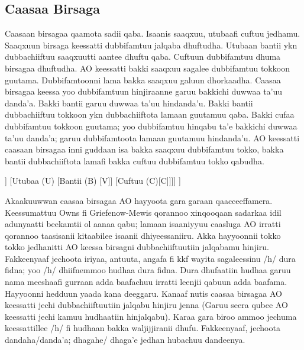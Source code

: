 \documentclass[11pt,b5paper]{book}
\begin{document}
\begin{itemize}
\subsection{Caasaa Birsaga}
\setlength{\parindent}{3em}

Caasaan birsagaa qaamota sadii qaba. Isaanis saaqxuu,  utubaafi cuftuu jedhamu. Saaqxuun birsaga keessatti  dubbifamtuu jalqaba dhuftudha. Utubaan bantii ykn  dubbachiiftuu saaqxuutti aantee dhuftu qaba. Cuftuun  dubbifamtuu dhuma birsagaa dhuftudha. AO keessatti bakki  saaqxuu sagalee dubbifamtuu tokkoon guutama.  Dubbifamtoonni lama bakka saaqxuu galuun dhorkaadha.  Caasaa birsagaa keessa yoo dubbifamtuun hinjiraanne garuu  bakkichi duwwaa ta’uu danda’a. Bakki bantii garuu duwwaa  ta’uu hindanda’u. Bakki bantii dubbachiiftuu tokkoon ykn  dubbachiiftota lamaan guutamuu qaba. Bakki cufaa  dubbifamtuu tokkoon guutama; yoo dubbifamtuu hinqabu ta’e  bakkichi duwwaa ta’uu danda’a; garuu dubbifamtoota lamaan  guutamuu hindanda’u. AO keessatti caasaan birsagaa inni guddaan isa bakka saaqxuu dubbifamtuu tokko, bakka bantii dubbachiiftota lamafi bakka cuftuu dubbifamtuu tokko qabudha. 

\begin{forest}
	[Birsaga  [Saaqxuu (S) [C]] [Utubaa (U) [Bantii (B) [V]] [Cuftuu (C)[C]]]]
	]
\end{forest}  

Akaakuuwwan caasaa birsagaa AO hayyoota gara garaan qaacceeffamera\cite{Addunya2018,griefenow2001grammatical,gragg1976oromo}. Keessumattuu Owns fi Griefenow-Mewis  qorannoo xinqooqaan sadarkaa idil adunyaatti beekamtii ol  aanaa qabu; lamaan isaaniyyuu caasluga AO irratti qorannoo  taasisanii kitaabilee isaanii dhiyeessaniiru. Akka hayyoonnii tokko tokko jedhanitti\cite[p.21]{griefenow2001grammatical} AO keessa birsagni  dubbachiiftuutiin jalqabamu hinjiru. Fakkeenyaaf jechoota  iriyaa, antuuta, angafa fi kkf wayita sagaleessinu /h/ dura  fidna; yoo /h/ dhiifnemmoo hudhaa dura fidna. Dura dhufaatiin  hudhaa garuu nama meeshaafi gurraan adda baafachuu irratti  leenjii qabuun adda baafama. Hayyoonni hedduun yaada kana  deeggaru. Kanaaf nutis caasaa birsagaa AO keessatti jechi  dubbachiiftuutiin jalqabu hinjiru jenna (Garuu seera qubee AO  keessatti jechi kamuu hudhaatiin hinjalqabu). Karaa gara biroo  ammoo jechuma keessattillee /h/ fi hudhaan bakka waljijjiranii  dhufu. Fakkeenyaaf, jechoota dandaha/danda’a; dhagahe/ dhaga’e jedhan hubachuu dandeenya\cite{griefenow2001grammatical}. 


\end{itemize}
\end{document}
